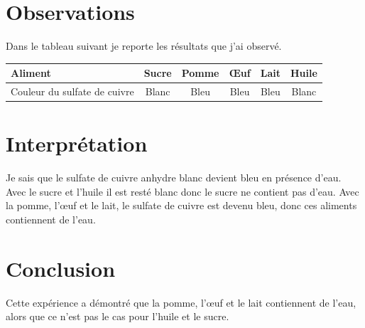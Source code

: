 \documentclass[12pt,a4paper]{article}
\begin{document}
\section{Observations}

Dans le tableau suivant je reporte les résultats que j'ai observé.

\begin{tabular}{|@{\ }l@{\ }|@{\ }c@{\ }|@{\ }c@{\ }|@{\ }c@{\ }|@{\ }c@{\ }|@{\ }c@{\ }|}
	\hline
	Aliment                      & Sucre & Pomme & \OE uf & Lait & Huile \\ \hline
	Couleur du sulfate de cuivre & Blanc & Bleu  & Bleu   & Bleu & Blanc \\ \hline
\end{tabular}


\section{Interprétation}

Je sais que le sulfate de cuivre anhydre blanc devient bleu en présence d'eau. Avec le sucre et l'huile il est resté blanc donc le sucre ne contient pas d'eau. Avec la pomme, l'\oe uf et le lait, le sulfate de cuivre est devenu bleu, donc ces aliments contiennent de l'eau.

\section{Conclusion}

Cette expérience a démontré que la pomme, l'\oe uf et le lait contiennent de l'eau, alors que ce n'est pas le cas pour l'huile et le sucre.
\end{document}
